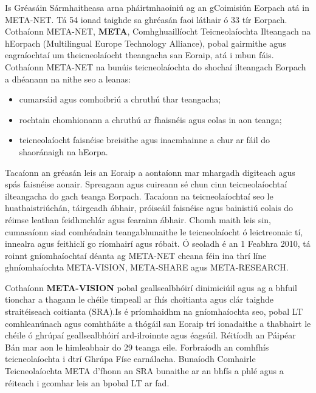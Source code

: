 \begin{multicols}{2}

Is Gréasáin Sármhaitheasa arna pháirtmhaoiniú ag an gCoimisiún Eorpach atá in META-NET. Tá 54 ionad taighde sa ghréasán faoi láthair ó 33 tír Eorpach. Cothaíonn META-NET, \textbf{META}, Comhghuaillíocht Teicneolaíochta Ilteangach na hEorpach (Multilingual Europe Technology Alliance), pobal gairmithe agus eagraíochtaí um theicneolaíocht theangacha san Eoraip, atá i mbun fáis. Cothaíonn META-NET na bunúis teicneolaíochta do shochaí ilteangach Eorpach a dhéanann na nithe seo a leanas: 
 

\begin{itemize}
\item cumarsáid agus comhoibriú a chruthú thar teangacha;
\item rochtain chomhionann a chruthú ar fhaisnéis agus eolas in aon teanga;
\item teicneolaíocht faisnéise breisithe agus inacmhainne a chur ar fáil do shaoránaigh na hEorpa.
\end{itemize}

Tacaíonn an gréasán leis an Eoraip a aontaíonn mar mhargadh digiteach agus spás faisnéise aonair. Spreagann agus cuireann sé chun cinn teicneolaíochtaí ilteangacha do gach teanga Eorpach. Tacaíonn na teicneolaíochtaí seo le huathaistriúchán, táirgeadh ábhair, próiseáil faisnéise agus bainistiú eolais do réimse leathan feidhmchlár agus fearainn ábhair. Chomh maith leis sin, cumasaíonn siad comhéadain teangabhunaithe le teicneolaíocht ó leictreonaic tí, innealra agus feithiclí go ríomhairí agus róbait.
Ó seoladh é an 1 Feabhra 2010, tá roinnt gníomhaíochtaí déanta ag META-NET cheana féin ina thrí líne ghníomhaíochta META-VISION, META-SHARE agus META-RESEARCH. 
 
Cothaíonn \textbf{META-VISION} pobal geallsealbhóirí dinimiciúil agus ag a bhfuil tionchar a thagann le chéile timpeall ar fhís choitianta agus clár taighde straitéiseach coitianta (SRA).Is é príomhaidhm na gníomhaíochta seo, pobal LT comhleanúnach agus comhtháite a thógáil san Eoraip trí ionadaithe a thabhairt le chéile ó ghrúpaí geallsealbhóirí ard-ilroinnte agus éagsúil. Réitíodh an Páipéar Bán mar aon le himleabhair do 29 teanga eile. Forbraíodh an comhfhís teicneolaíochta i dtrí Ghrúpa Físe earnálacha. Bunaíodh Comhairle Teicneolaíochta META d’fhonn an SRA bunaithe ar an bhfís a phlé agus a réiteach i gcomhar leis an bpobal LT ar fad.


\end{multicols}
